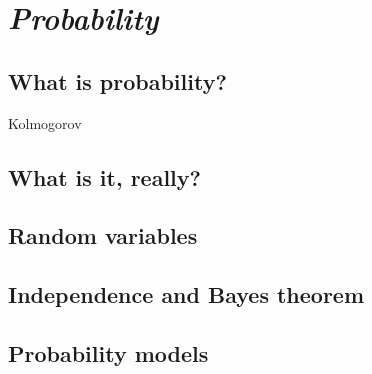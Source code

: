 \chapter{\emph{Probability}} 
\label{probability}

\section{What is probability?}
Kolmogorov 

\section{What is it, really?}

\section{Random variables}

\section{Independence and Bayes theorem}

\section{Probability models}
